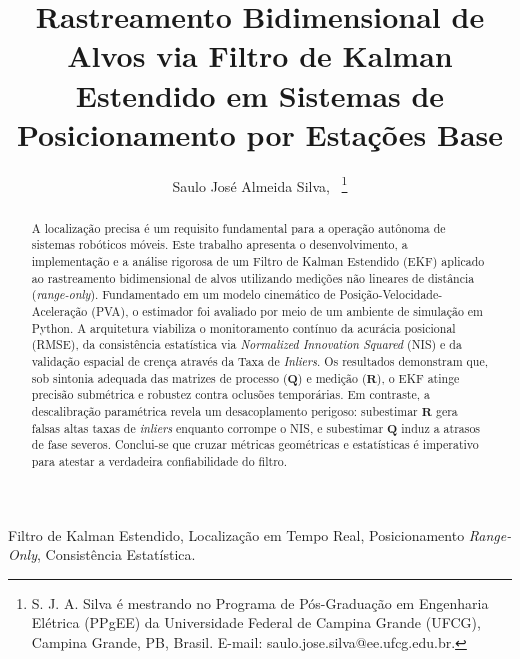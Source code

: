 \documentclass[journal]{IEEEtran}
\title{Rastreamento Bidimensional de Alvos via Filtro de Kalman Estendido em Sistemas de Posicionamento por Estações Base}
\author{Saulo José Almeida Silva,~\IEEEmembership{Mestrando,~UFCG,}%
        \thanks{S. J. A. Silva é mestrando no Programa de Pós-Graduação em Engenharia Elétrica (PPgEE) da Universidade Federal de Campina Grande (UFCG), Campina Grande, PB, Brasil. E-mail: saulo.jose.silva@ee.ufcg.edu.br.}}
\begin{document}
\maketitle

\begin{abstract}
A localização precisa é um requisito fundamental para a operação autônoma de sistemas robóticos móveis. Este trabalho apresenta o desenvolvimento, a implementação e a análise rigorosa de um Filtro de Kalman Estendido (EKF) aplicado ao rastreamento bidimensional de alvos utilizando medições não lineares de distância (\textit{range-only}). Fundamentado em um modelo cinemático de Posição-Velocidade-Aceleração (PVA), o estimador foi avaliado por meio de um ambiente de simulação em Python. A arquitetura viabiliza o monitoramento contínuo da acurácia posicional (RMSE), da consistência estatística via \textit{Normalized Innovation Squared} (NIS) e da validação espacial de crença através da Taxa de \textit{Inliers}. Os resultados demonstram que, sob sintonia adequada das matrizes de processo ($\mathbf{Q}$) e medição ($\mathbf{R}$), o EKF atinge precisão submétrica e robustez contra oclusões temporárias. Em contraste, a descalibração paramétrica revela um desacoplamento perigoso: subestimar $\mathbf{R}$ gera falsas altas taxas de \textit{inliers} enquanto corrompe o NIS, e subestimar $\mathbf{Q}$ induz a atrasos de fase severos. Conclui-se que cruzar métricas geométricas e estatísticas é imperativo para atestar a verdadeira confiabilidade do filtro.
\end{abstract}

\begin{IEEEkeywords}
Filtro de Kalman Estendido, Localização em Tempo Real, Posicionamento \textit{Range-Only}, Consistência Estatística.
\end{IEEEkeywords}

\IEEEpeerreviewmaketitle









\end{document}
